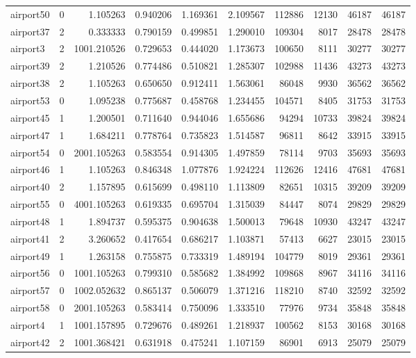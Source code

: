 \begin{longtable}{|l|r|r|r|r|r|r|r|r|r|}
airport50 & 0 & 1.105263 & 0.940206 & 1.169361 & 2.109567 & 112886 & 12130 & 46187 & 46187 \\
airport37 & 2 & 0.333333 & 0.790159 & 0.499851 & 1.290010 & 109304 & 8017 & 28478 & 28478 \\
airport3 & 2 & 1001.210526 & 0.729653 & 0.444020 & 1.173673 & 100650 & 8111 & 30277 & 30277 \\
airport39 & 2 & 1.210526 & 0.774486 & 0.510821 & 1.285307 & 102988 & 11436 & 43273 & 43273 \\
airport38 & 2 & 1.105263 & 0.650650 & 0.912411 & 1.563061 & 86048 & 9930 & 36562 & 36562 \\
airport53 & 0 & 1.095238 & 0.775687 & 0.458768 & 1.234455 & 104571 & 8405 & 31753 & 31753 \\
airport45 & 1 & 1.200501 & 0.711640 & 0.944046 & 1.655686 & 94294 & 10733 & 39824 & 39824 \\
airport47 & 1 & 1.684211 & 0.778764 & 0.735823 & 1.514587 & 96811 & 8642 & 33915 & 33915 \\
airport54 & 0 & 2001.105263 & 0.583554 & 0.914305 & 1.497859 & 78114 & 9703 & 35693 & 35693 \\
airport46 & 1 & 1.105263 & 0.846348 & 1.077876 & 1.924224 & 112626 & 12416 & 47681 & 47681 \\
airport40 & 2 & 1.157895 & 0.615699 & 0.498110 & 1.113809 & 82651 & 10315 & 39209 & 39209 \\
airport55 & 0 & 4001.105263 & 0.619335 & 0.695704 & 1.315039 & 84447 & 8074 & 29829 & 29829 \\
airport48 & 1 & 1.894737 & 0.595375 & 0.904638 & 1.500013 & 79648 & 10930 & 43247 & 43247 \\
airport41 & 2 & 3.260652 & 0.417654 & 0.686217 & 1.103871 & 57413 & 6627 & 23015 & 23015 \\
airport49 & 1 & 1.263158 & 0.755875 & 0.733319 & 1.489194 & 104779 & 8019 & 29361 & 29361 \\
airport56 & 0 & 1001.105263 & 0.799310 & 0.585682 & 1.384992 & 109868 & 8967 & 34116 & 34116 \\
airport57 & 0 & 1002.052632 & 0.865137 & 0.506079 & 1.371216 & 118210 & 8740 & 32592 & 32592 \\
airport58 & 0 & 2001.105263 & 0.583414 & 0.750096 & 1.333510 & 77976 & 9734 & 35848 & 35848 \\
airport4 & 1 & 1001.157895 & 0.729676 & 0.489261 & 1.218937 & 100562 & 8153 & 30168 & 30168 \\
airport42 & 2 & 1001.368421 & 0.631918 & 0.475241 & 1.107159 & 86901 & 6913 & 25079 & 25079 \\

\end{longtable}
